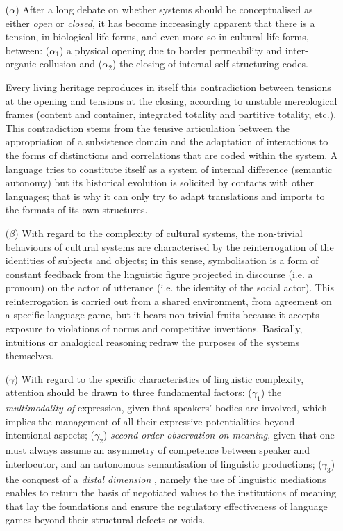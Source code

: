 \documentclass[output=paper]{langscibook}
\begin{document}
\begin{enumerate}\sloppy
\item[(${\alpha}$)] After a long debate on whether systems should be conceptualised as either \textit{open} or \textit{closed}, it has become increasingly apparent that there is a tension, in biological life forms, and even more so in cultural life forms, between: (${\alpha_1}$) a physical opening due to border permeability and inter-organic collusion and (${\alpha_2}$) the closing of internal self-structuring codes. 

Every living heritage reproduces in itself this contradiction between tensions at the opening and tensions at the closing, according to unstable mereological frames (content and container, integrated totality and partitive totality, etc.). This contradiction stems from the tensive articulation between the appropriation of a subsistence domain and the adaptation of interactions to the forms of distinctions and correlations that are coded within the system. A language tries to constitute itself as a system of internal difference (semantic autonomy) but its historical evolution is solicited by contacts with other languages; that is why it can only try to adapt translations and imports to the formats of its own structures.

\item[(${\beta}$)] With regard to the complexity of cultural systems, the non-trivial behaviours of cultural systems are characterised by the reinterrogation of the identities of subjects and objects; in this sense, symbolisation is a form of constant feedback from the linguistic figure projected in discourse (i.e. a pronoun) on the actor of utterance (i.e. the identity of the social actor). This reinterrogation is carried out from a shared environment, from agreement on a specific language game, but it bears non-trivial fruits because it accepts exposure to violations of norms and competitive inventions. Basically, intuitions or analogical reasoning redraw the purposes of the systems themselves.

\item[(${\gamma}$)] With regard to the specific characteristics of linguistic complexity, attention should be drawn to three fundamental factors: ($\gamma_1$) the \textit{multimodality of} expression, given that speakers’ bodies are involved, which implies the management of all their expressive potentialities beyond intentional aspects; (${\gamma_2}$) \textit{second order observation on meaning}, given that one must always assume an asymmetry of competence between speaker and interlocutor, and an autonomous semantisation of linguistic productions; (${\gamma_3}$) the conquest of a \textit{distal dimension} \citep{Rastier2001}, namely the use of linguistic mediations enables to return the basis of negotiated values to the institutions of meaning that lay the foundations and ensure the regulatory effectiveness of language games beyond their structural defects or voids.
\end{enumerate}
\end{document}
